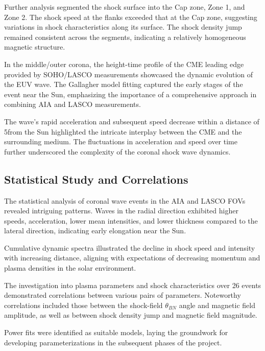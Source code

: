Further analysis segmented the shock surface into the Cap zone, Zone 1, and Zone 2. The shock speed at the flanks exceeded that at the Cap zone, suggesting variations in shock characteristics along its surface. The shock density jump remained consistent across the segments, indicating a relatively homogeneous magnetic structure.

In the middle/outer corona, the height-time profile of the CME leading edge provided by SOHO/LASCO measurements showcased the dynamic evolution of the EUV wave. The Gallagher model fitting captured the early stages of the event near the Sun, emphasizing the importance of a comprehensive approach in combining AIA and LASCO measurements.

The wave's rapid acceleration and subsequent speed decrease within a distance of 5\rsun from the Sun highlighted the intricate interplay between the CME and the surrounding medium. The fluctuations in acceleration and speed over time further underscored the complexity of the coronal shock wave dynamics.

\subsection{Statistical Study and Correlations}
The statistical analysis of coronal wave events in the AIA and LASCO FOVs revealed intriguing patterns. Waves in the radial direction exhibited higher speeds, acceleration, lower mean intensities, and lower thickness compared to the lateral direction, indicating early elongation near the Sun.

Cumulative dynamic spectra illustrated the decline in shock speed and intensity with increasing distance, aligning with expectations of decreasing momentum and plasma densities in the solar environment.

The investigation into plasma parameters and shock characteristics over 26 events demonstrated correlations between various pairs of parameters. Noteworthy correlations included those between the shock-field $\theta_{BN}$ angle and magnetic field amplitude, as well as between shock density jump and magnetic field magnitude.

Power fits were identified as suitable models, laying the groundwork for developing parameterizations in the subsequent phases of the project.

